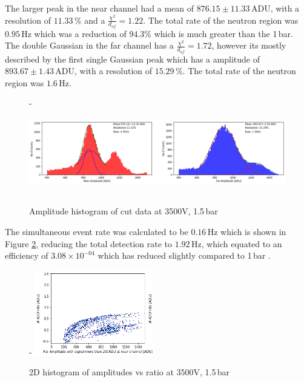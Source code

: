 \documentclass[a4paper]{article}
\begin{document}
\newline The larger peak in the near channel had a mean of $876.15 \pm 11.33$\,ADU, with a resolution of $11.33$\,\% and a $\frac{\chi^2}{d_{of}} = 1.22$. The total rate of the neutron region was $0.95$\,Hz which was a reduction of 94.3\% which is much greater than the 1\,bar. 
\newline The double Gaussian in the far channel has a $\frac{\chi^2}{d_{of}} = 1.72$, however its mostly described by the first single Gaussian peak which has a amplitude of $893.67 \pm 1.43$\,ADU, with a resolution of $15.29$\,\%. The total rate of the neutron region was $1.6$\,Hz.
\begin{figure}[H]-
    \centering
    \includegraphics[height=3.7cm]{uk24n002_amp2.png}
    \caption{Amplitude histogram of cut data at 3500V, 1.5\,bar}
    \label{fig:2amp}
\end{figure}
\noindent The simultaneous event rate was calculated to be $0.16$\,Hz which is shown in Figure \ref{fig:2sym}, reducing the total detection rate to $1.92$\,Hz, which equated to an efficiency of $3.08\times 10^{-04}$ which has reduced slightly compared to 1\,bar .
\begin{figure}[H]-
    \centering
    \includegraphics[height=3.7cm]{uk24n002_symcutgood1.png}
    \caption{2D histogram of amplitudes vs ratio at 3500V, 1.5\,bar}
    \label{fig:2sym}
\end{figure}
\end{document}
